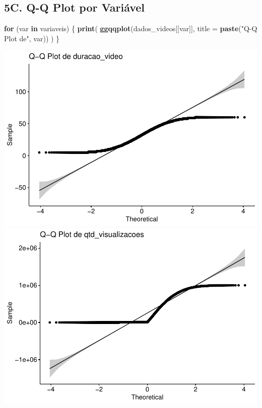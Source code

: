 \documentclass[
]{article}
\newenvironment{Shaded}{\begin{snugshade}}{\end{snugshade}}
\newcommand{\AttributeTok}[1]{\textcolor[rgb]{0.13,0.29,0.53}{#1}}
\newcommand{\ControlFlowTok}[1]{\textcolor[rgb]{0.13,0.29,0.53}{\textbf{#1}}}
\newcommand{\FunctionTok}[1]{\textcolor[rgb]{0.13,0.29,0.53}{\textbf{#1}}}
\newcommand{\NormalTok}[1]{#1}
\newcommand{\StringTok}[1]{\textcolor[rgb]{0.31,0.60,0.02}{#1}}
\begin{document}
\subsection{5C. Q-Q Plot por
Variável}\label{c.-q-q-plot-por-variuxe1vel}

\begin{Shaded}
\begin{Highlighting}[]
\ControlFlowTok{for}\NormalTok{ (var }\ControlFlowTok{in}\NormalTok{ variaveis) \{}
  \FunctionTok{print}\NormalTok{(}
    \FunctionTok{ggqqplot}\NormalTok{(dados\_videos[[var]], }\AttributeTok{title =} \FunctionTok{paste}\NormalTok{(}\StringTok{"Q{-}Q Plot de"}\NormalTok{, var))}
\NormalTok{  )}
\NormalTok{\}}
\end{Highlighting}
\end{Shaded}

\includegraphics{dados_videos_files/figure-latex/qqplot_variaveis-1.pdf}
\includegraphics{dados_videos_files/figure-latex/qqplot_variaveis-2.pdf}
\end{document}
